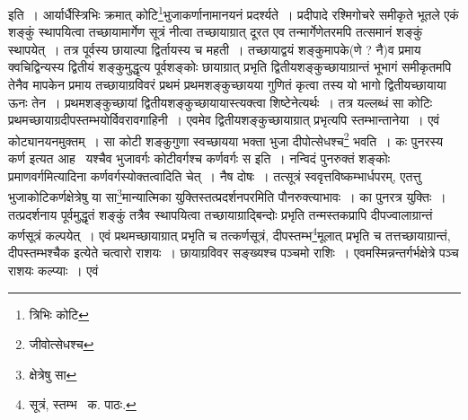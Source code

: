 \documentclass[11pt, openany]{book}
\begin{document}
इति~। आर्यार्धैस्त्रिभिः क्रमात् कोटि\renewcommand{\thefootnote}{१}\footnote{त्रिभिः कोटि}भुजाकर्णानामानयनं प्रदर्श्यते~। प्रदीपादे रश्मिगोचरे समीकृते भूतले एकं शङ्कुं स्थापयित्वा
तच्छायामार्गेण सूत्रं नीत्वा तच्छायाग्रात् दूरत एव तन्मार्गेणेतरमपि तत्समानं शङ्कुं स्थापयेत्~। तत्र पूर्वस्य छायाल्पा द्विर्तायस्य च महती~। तच्छायाद्वयं शङ्कुमापके(णे ? नै)व प्रमाय क्वचिद्विन्यस्य द्वितीयं शङ्कुमुद्धृत्य पूर्वशङ्कोः छायाग्रात् प्रभृति द्वितीयशङ्कुच्छायाग्रान्तं भूभागं समीकृतमपि तेनैव मापकेन प्रमाय तच्छायाग्रविवरं प्रथमं प्रथमशङ्कुच्छायया गुणितं कृत्वा तस्य यो भागो द्वितीयच्छायाया ऊनः तेन~। प्रथमशङ्कुच्छायां
द्वितीयशङ्कुच्छायायास्त्यक्त्वा शिष्टेनेत्यर्थः~। तत्र यल्लब्धं सा कोटिः प्रथमच्छायाग्रदीपस्तम्भयोर्विवरावगाहिनी~। एवमेव द्वितीयशङ्कुच्छायाग्रात् प्रभृत्यपि स्तम्भान्तानेया~। एवं कोट्यानयनमुक्तम्~। सा कोटी शङ्कुगुणा स्वच्छायया भक्ता भुजा दीपोत्सेधश्च\renewcommand{\thefootnote}{२}\footnote{जीवोत्सेधश्च} भवति~। कः पुनरस्य कर्ण इत्यत आह \textendash\ {\qt यश्चैव भुजावर्गः कोटीवर्गश्च कर्णवर्गः स} इति~। नन्विदं पुनरुक्तं शङ्कोः प्रमाणवर्गमित्यादिना कर्णवर्गस्योक्तत्वादिति चेत्~। नैष दोषः~। तत्सूत्रं स्ववृत्तविष्कम्भार्धपरम्, एतत्तु भुजाकोटिकर्णक्षेत्रेषु या सा\renewcommand{\thefootnote}{३}\footnote{क्षेत्रेषु सा}मान्यात्मिका युक्तिस्तत्प्रदर्शनपरमिति पौनरुक्त्याभावः~। का पुनरत्र युक्तिः~। तत्प्रदर्शनाय पूर्वमुद्धृतं शङ्कुं तत्रैव स्थापयित्वा तच्छायाग्राद्बिन्दोः प्रभृति तन्मस्तकप्रापि दीपज्वालाग्रान्तं कर्णसूत्रं कल्पयेत्~। एवं प्रथमच्छायाग्रात् प्रभृति च तत्कर्णसूत्रं, दीपस्तम्भ\renewcommand{\thefootnote}{४}\footnote{सूत्रं, स्तम्भ \textendash\ क. पाठः.}मूलात् प्रभृति च तत्तच्छायाग्रान्तं, दीपस्तम्भश्चैक इत्येते चत्वारो राशयः~। छायाग्रविवर सङ्ख्यश्च पञ्चमो राशिः~। एवमस्मिन्नन्तर्गर्भक्षेत्रे पञ्च राशयः कल्प्याः~। एवं

\newpage 
\end{document}

